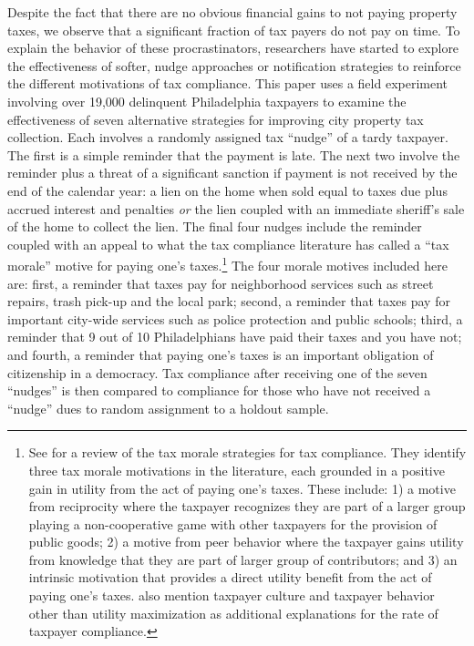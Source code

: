 \documentclass[12pt]{article}
\begin{document}
Despite the fact that there are no obvious financial gains to not
paying property taxes, we observe that a significant fraction of tax
payers do not pay on time. To explain the behavior of these
procrastinators, researchers have started to explore the effectiveness
of softer, nudge approaches or notification strategies to reinforce
the different motivations of tax compliance.  This paper uses a field
experiment involving over 19,000 delinquent Philadelphia taxpayers to
examine the effectiveness of seven alternative strategies for
improving city property tax collection. Each involves a randomly
assigned tax ``nudge'' of a tardy taxpayer.  The first is a
simple reminder that the payment is late.  The next two involve the
reminder plus a threat of a significant sanction if payment is not
received by the end of the calendar year: a lien on the home when sold
equal to taxes due plus accrued interest and penalties \textit{or} the
lien coupled with an immediate sheriff's sale of the home to collect
the lien.  The final four nudges include the reminder coupled with an
appeal to what the tax compliance literature has called a ``tax
morale'' motive for paying one's taxes.\footnote{See
   for a review of the tax morale strategies for tax
  compliance.  They identify three tax morale motivations in the
  literature, each grounded in a positive gain in utility from the act
  of paying one's taxes.  These include: 1) a motive from reciprocity
  where the taxpayer recognizes they are part of a larger group
  playing a non-cooperative game with other taxpayers for the provision of public goods; 2) a motive
  from peer behavior where the taxpayer gains utility from knowledge
  that they are part of larger group of contributors; and 3) an
  intrinsic motivation that provides a direct utility benefit from the
  act of paying one's taxes.   also mention taxpayer
  culture and taxpayer behavior other than utility maximization as
  additional explanations for the rate of taxpayer compliance. }  The
four morale motives included here are: first, a reminder that taxes
pay for neighborhood services such as street repairs, trash pick-up
and the local park; second, a reminder that taxes pay for important
city-wide services such as police protection and public schools;
third, a reminder that 9 out of 10 Philadelphians have paid their
taxes and you have not; and fourth, a reminder that paying one's taxes
is an important obligation of citizenship in a democracy.  Tax
compliance after receiving one of the seven ``nudges'' is then
compared to compliance for those who have not received a ``nudge'' 
dues to random assignment to a holdout sample.
\end{document}
